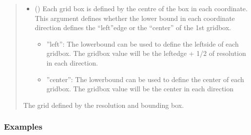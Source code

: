\documentclass[letterpaper,10pt,english]{sphinxmanual}
\begin{document}
\begin{fulllineitems}
\begin{quote}
\begin{description}
\begin{itemize}
\item {}
\sphinxAtStartPar
{} () \textendash{}
\sphinxAtStartPar
Each grid box is defined by the centre of the box in each coordinate.
This argument defines whether the lower bound in each coordinate
direction defines the “left”\sphinxhyphen{}edge or the “center” of the 1st grid\sphinxhyphen{}box.
\begin{itemize}
\item {}
\sphinxAtStartPar
”left”: The lower\sphinxhyphen{}bound can be used to define the left\sphinxhyphen{}side of each
grid\sphinxhyphen{}box. The grid\sphinxhyphen{}box value will be the left\sphinxhyphen{}edge + 1/2 of resolution
in each direction.

\item {}
\sphinxAtStartPar
”center”: The lower\sphinxhyphen{}bound can be used to define the center of each
grid\sphinxhyphen{}box. The grid\sphinxhyphen{}box value will be the center in each direction

\end{itemize}


\end{itemize}

\sphinxAtStartPar
{} \textendash{} The grid defined by the resolution and bounding box.

\sphinxAtStartPar
{}

\end{description}\end{quote}
\subsubsection*{Examples}


\end{fulllineitems}
\end{document}
